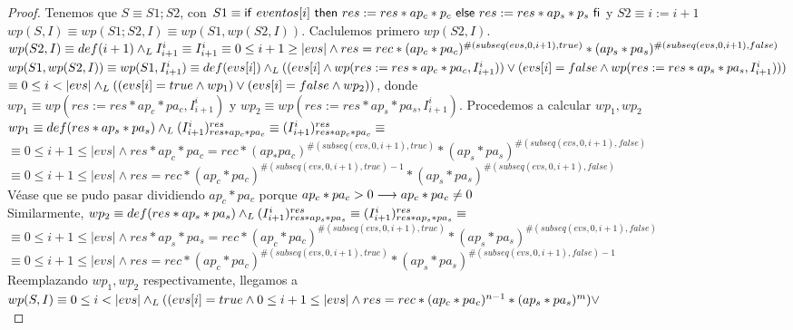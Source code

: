 \documentclass[10pt,a4paper]{article}
\begin{document}
\begin{proof}
    Tenemos que $S \equiv S1; S2$, con $S1 \equiv \mathsf{if}\ eventos[i]\ \mathsf{then}\ res:=res * ap_c * p_c\ \mathsf{else}\ res:=res*ap_s*p_s\ \mathsf{fi}$ y $S2 \equiv i:= i+1$\\
	$wp(S, I) \equiv wp(S1; S2, I) \equiv wp(S1, wp(S2, I))$.
	Caclulemos primero $wp(S2, I)$. \\ 
	$wp(S2, I) \equiv def(i+1) \land _L I_{i+1}^i \equiv I_{i+1}^i \equiv\\
	0 \leq i+1 \geq |evs| \wedge res = rec *  (ap_c * pa_c)^{\#(subseq(evs, 0, i+1), true)} * (ap_s * pa_s)^{\#(subseq(evs, 0, i+1), false)}$\\
	$wp(S1, wp(S2, I)) \equiv wp(S1, I_{i+1}^i) \equiv def(evs[i]) \land _L ((evs[i] \wedge wp(res:=res * ap_c * pa_c, I_{i+1}^i)) \vee (evs[i] = false \wedge wp(res:=res * ap_s * pa_s, I_{i+1}^i)) ) $\\
	$\equiv 0 \leq i < |evs| \land _L ((evs[i] = true \wedge wp_1) \vee (evs[i] = false \wedge wp_2))$, donde \\
	$wp_1 \equiv wp(res:= res* ap_c * pa_c, I_{i+1}^i)$ y $wp_2 \equiv wp(res:= res*ap_s *pa_s, I_{i+1}^i)$. 
	Procedemos a calcular $wp_1, wp_2$\\
	$wp_1 \equiv def (res*ap_s*pa_s) \land _L (I_{i+1}^i)_{res*ap_c*pa_c}^{res} \equiv (I_{i+1}^i)_{res*ap_c*pa_c}^{res} \equiv$
	$\equiv 0\leq i+1 \leq |evs| \wedge res * ap_c * pa_c = rec *(ap_ * pa_c)^{\#(subseq(evs, 0, i+1), true)} * (ap_s * pa_s)^{\#(subseq(evs, 0, i+1), false)}$\\
	$\equiv 0\leq i+1 \leq |evs| \wedge res = rec *(ap_c * pa_c)^{\#(subseq(evs, 0, i+1), true) - 1} * (ap_s * pa_s)^{\#(subseq(evs, 0, i+1), false)}$\\
	Véase que se pudo pasar dividiendo $ap_c * pa_c$ porque $ap_c * pa_c > 0 \longrightarrow ap_c * pa_c \not= 0$ \\
	Similarmente,
	$wp_2 \equiv def (res*ap_s*pa_s) \land _L (I_{i+1}^i)_{res*ap_s*pa_s}^{res} \equiv (I_{i+1}^i)_{res*ap_s*pa_s}^{res} \equiv$
	$\equiv 0\leq i+1 \leq |evs| \wedge res * ap_s * pa_s = rec *(ap_c * pa_c)^{\#(subseq(evs, 0, i+1), true)} * (ap_s * pa_s)^{\#(subseq(evs, 0, i+1), false)}$\\
	$\equiv 0\leq i+1 \leq |evs| \wedge res = rec *(ap_c * pa_c)^{\#(subseq(evs, 0, i+1), true)} * (ap_s * pa_s)^{\#(subseq(evs, 0, i+1), false) - 1}$\\
	Reemplazando $wp_1, wp_2$ respectivamente, llegamos a \\
	$wp(S, I) \equiv 0 \leq i < |evs| \land _L ((evs[i] = true \wedge 0\leq i+1 \leq |evs| \wedge res = rec *(ap_c * pa_c)^{n - 1} * (ap_s * pa_s)^m) \vee $\\

\end{proof}
\end{document}

